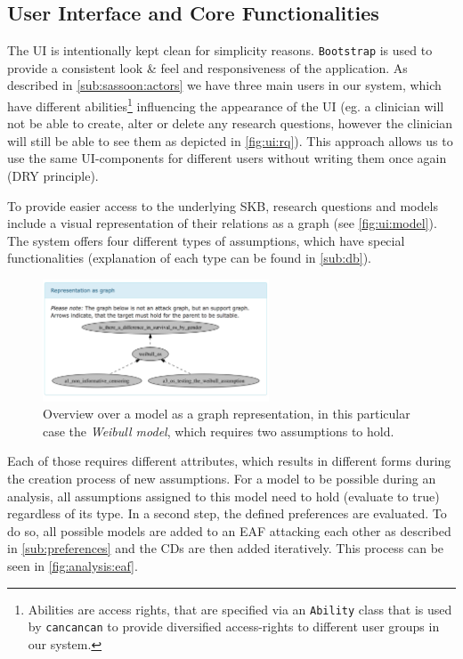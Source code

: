\subsection{User Interface and Core Functionalities}
\label{sub:ui}

The \gls{UI} is intentionally kept clean for simplicity reasons. \texttt{Bootstrap} is used to provide a consistent look \& feel and responsiveness of the application. As described in \autoref{sub:sassoon:actors} we have three main users in our system, which have different abilities\footnote{Abilities are access rights, that are specified via an \texttt{Ability} class that is used by \texttt{cancancan} to provide diversified access-rights to different user groups in our system.} influencing the appearance of the \gls{UI} (eg. a clinician will not be able to create, alter or delete any research questions, however the clinician will still be able to see them as depicted in \autoref{fig:ui:rq}). This approach allows us to use the same \gls{UI}-components for different users without writing them once again (\gls{DRY} principle).



To provide easier access to the underlying \gls{SKB}, research questions and models include a visual representation of their relations as a graph (see \autoref{fig:ui:model}). The system offers four different types of assumptions, which have special functionalities (explanation of each type can be found in \autoref{sub:db}).




\begin{figure}[hbtp]
\centering
\includegraphics[width=0.6\textwidth]{figures/ui_Weibull_Model}
\caption{Overview over a model as a graph representation, in this particular case the \textit{Weibull model}, which requires two assumptions to hold.}
\label{fig:ui:model}
\end{figure}

Each of those requires different attributes, which results in different forms during the creation process of new assumptions. For a model to be possible during an analysis, all assumptions assigned to this model need to hold (evaluate to true) regardless of its type. In a second step, the defined \glspl{preference} are evaluated. To do so, all possible models are added to an \gls{EAF} attacking each other as described in \autoref{sub:preferences} and the \glspl{CD} are then added iteratively. This process can be seen in \autoref{fig:analysis:eaf}.

